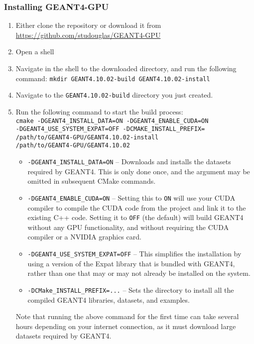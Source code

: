 \documentclass[12pt]{article}
\begin{document}
\subsubsection{Installing GEANT4-GPU}
\begin{enumerate}
\item Either clone the repository or download it from \url{https://github.com/studouglas/GEANT4-GPU}
\item Open a shell
\item \label{StepMkdir} Navigate in the shell to the downloaded directory, and run the following command: \texttt{mkdir GEANT4.10.02-build GEANT4.10.02-install}
\item Navigate to the \texttt{GEANT4.10.02-build} directory you just created.
\item \label{StepCMake} Run the following command to start the build process:\\
\texttt{cmake -DGEANT4\_INSTALL\_DATA=ON -DGEANT4\_ENABLE\_CUDA=ON\\
 -DGEANT4\_USE\_SYSTEM\_EXPAT=OFF -DCMAKE\_INSTALL\_PREFIX=\\
 /path/to/GEANT4-GPU/GEANT4.10.02-install \\
 /path/to/GEANT4-GPU/GEANT4.10.02}
\begin{itemize}
\item \texttt{-DGEANT4\_INSTALL\_DATA=ON} -- Downloads and installs the datasets required by GEANT4. This is only done once, and the argument may be omitted in subsequent CMake commands.
\item \texttt{-DGEANT4\_ENABLE\_CUDA=ON} -- Setting this to \texttt{ON} will use your CUDA compiler to compile the CUDA code from the project and link it to the existing C++ code. Setting it to \texttt{OFF} (the default) will build GEANT4 without any GPU functionality, and without requiring the CUDA compiler or a NVIDIA graphics card.
\item \texttt{-DGEANT4\_USE\_SYSTEM\_EXPAT=OFF} -- This simplifies the installation by using a version of the Expat library that is bundled with GEANT4, rather than one that may or may not already be installed on the system. 
\item \texttt{-DCMake\_INSTALL\_PREFIX=...} -- Sets the directory to install all the compiled GEANT4 libraries, datasets, and examples.
\end{itemize}
Note that running the above command for the first time can take several hours depending on your internet connection, as it must download large datasets required by GEANT4.\\


\end{enumerate}
\end{document}
